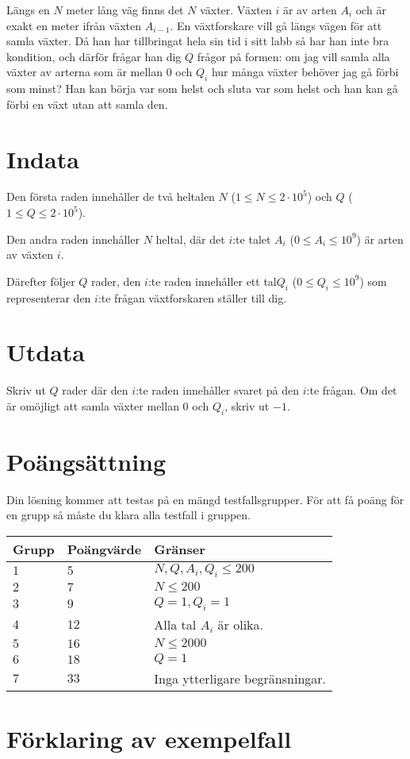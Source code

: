Längs en $N$ meter lång väg finns det $N$ växter. Växten $i$ är av arten $A_i$ och är exakt en meter ifrån växten $A_{i-1}$. En växtforskare vill gå längs vägen för att samla växter. Då han har tillbringat hela sin tid i sitt labb så har han inte bra kondition,
och därför frågar han dig $Q$ frågor på formen: om jag vill samla alla växter av arterna som är mellan $0$ och $Q_i$ hur många växter behöver jag gå förbi som minst? 
Han kan börja var som helst och sluta var som helst och han kan gå förbi en växt utan att samla den.
\section*{Indata}
Den första raden innehåller de två heltalen $N$ ($1\leq N \leq 2 \cdot 10^5$) och $Q$ ($1 \leq Q \leq 2 \cdot 10^5$).

Den andra raden innehåller $N$ heltal, där det $i$:te talet $A_i$ ($0\le A_i \le 10^9$) är arten av växten $i$.

Därefter följer $Q$ rader, den $i$:te raden innehåller ett tal$Q_i$ ($0 \leq Q_i \leq 10^9$) som representerar den $i$:te frågan växtforskaren ställer till dig.

\section*{Utdata}
Skriv ut $Q$ rader där den $i$:te raden innehåller svaret på den $i$:te frågan. Om det är omöjligt att samla växter mellan $0$ och $Q_i$, skriv ut $-1$.

\section*{Poängsättning}
Din lösning kommer att testas på en mängd testfallsgrupper.
För att få poäng för en grupp så måste du klara alla testfall i gruppen.

\noindent
\begin{tabular}{| l | l | p{12cm} |}
  \hline
  Grupp & Poängvärde & Gränser \\ \hline
  $1$   & $5$       & $N, Q, A_i, Q_i \leq 200 $\\ \hline
  $2$   & $7$       & $N \leq 200 $\\ \hline
  $3$   & $9$       & $Q=1, Q_i=1$\\ \hline
  $4$   & $12$       & Alla tal $A_i$ är olika. \\ \hline
  $5$   & $16$       & $N \leq 2000 $  \\ \hline
  $6$   & $18$       & $Q = 1$ \\ \hline
  $7$   & $33$       & Inga ytterligare begränsningar. \\ \hline
\end{tabular}

\section*{Förklaring av exempelfall}

